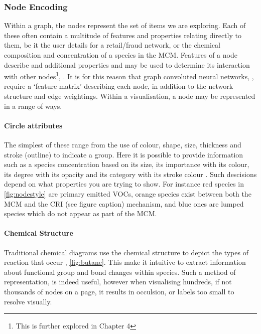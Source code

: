  




\subsubsection{Node Encoding}
Within a graph, the nodes represent the set of items we are exploring. Each of these often contain a multitude of features and properties relating directly to them, be it the user details for a retail/fraud network, or the chemical composition and concentration of a species in the MCM. Features of a node describe and additional properties and may be used to determine its interaction with other nodes\footnote{This is further explored in Chapter 4}, \cite{protocol}. It is for this reason that graph convoluted neural networks, \cite{t2gcn}, require a  `feature matrix' describing each node, in addition to the network structure and edge weightings. Within a visualisation, a node may be represented in a range of ways. 

\paragraph*{\color{c4}Circle attributes}



The simplest of these range from the use of colour, shape, size, thickness and stroke (outline) to indicate a group. Here it is possible to provide information such as a species concentration based on its size, its importance with its colour, its degree with its opacity and its category with its stroke colour \cite{brightness,colour}. Such descisions depend on what properties you are trying to show. For instance red species in \autoref{fig:nodestyle} are primary emitted VOCs, orange species exist between both the MCM and the CRI (see figure caption) mechanism, and blue ones are lumped species which do not appear as part of the MCM.  


\paragraph*{\color{c1}Chemical Structure}
Traditional chemical diagrams use the chemical structure to depict the types of reaction that occur , \autoref{fig:butane}. This make it intuitive to extract information about functional group and bond changes within species. Such a method of representation, is indeed useful, however when visualising hundreds, if not thousands of nodes on a page, it results in occulsion, or labels too small to resolve visually. 

